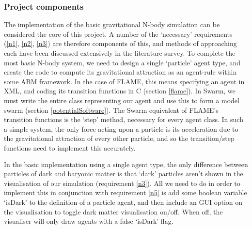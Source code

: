 \documentclass[11pt,a4paper]{article}
\begin{document}
\subsubsection{Project components}
The implementation of the basic gravitational N-body simulation can be considered the core of this project. A number of the `necessary' requirements (\ref{n1}, \ref{n2}, \ref{n3}) are therefore components of this, and methods of approaching each have been discussed extensively in the literature survey. To complete the most basic N-body system, we need to design a single `particle' agent type, and create the code to compute its gravitational attraction as an agent-rule within some ABM framework. In the case of FLAME, this means specifying an agent in XML, and coding its transition functions in C (section \ref{flame}). In Swarm, we must write the entire class representing our agent and use this to form a model swarm (section \ref{potentialSoftware}). The Swarm equivalent of FLAME's transition functions is the `step' method, necessary for every agent class. In such a simple system, the only force acting upon a particle is its acceleration due to the gravitational attraction of every other particle, and so the transition/step functions need to implement this accurately.

In the basic implementation using a single agent type, the only difference between particles of dark and baryonic matter is that `dark' particles aren't shown in the visualisation of our simulation (requirement \ref{n3}). All we need to do in order to implement this in conjunction with requirement \ref{n5} is add some boolean variable `isDark' to the definition of a particle agent, and then include an GUI option on the visualisation to toggle dark matter visualisation on/off. When off, the visualiser will only draw agents with a false `isDark' flag.
\end{document}
